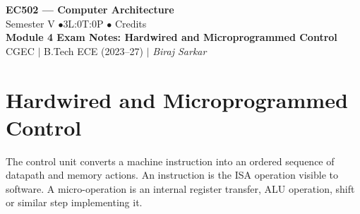 \documentclass[12pt,a4paper]{article}
\begin{document}

\begin{center}
  {\LARGE\bfseries\color{myred} EC502 --- Computer Architecture}\\[5pt]
  {\normalsize\color{mydark} Semester V \quad$\bullet$\quad 3L:0T:0P \quad$\bullet$ Credits}\\[3pt]
  {\normalsize\color{myteal}\textbf{Module 4 Exam Notes: Hardwired and Microprogrammed Control}}\\[3pt]
  {\small\color{mydark} CGEC \;$|$\; B.Tech ECE (2023--27) \;$|$\; \textit{Biraj Sarkar}}
\end{center}
\vspace{2pt}
\noindent{\color{myred}\rule{\linewidth}{1.5pt}}
\vspace{2pt}

\hypersetup{linkcolor=mydark}
\tableofcontents
\hypersetup{linkcolor=myteal}
\newpage

\section{Hardwired and Microprogrammed Control}
\begin{tcolorbox}[defbox,title={Control unit and instruction interpretation}]
The control unit converts a machine instruction into an ordered sequence of datapath and memory actions. An instruction is the ISA operation visible to software. A micro-operation is an internal register transfer, ALU operation, shift or similar step implementing it.
\end{tcolorbox}
\end{document}
